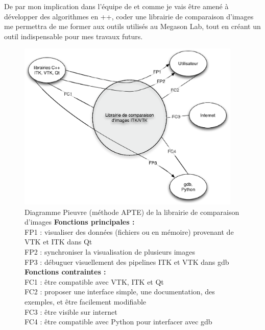 De par mon implication dans l'équipe de {\gofigure} et
comme je vais être amené à développer des algorithmes en {\C++},
coder une librairie de comparaison d'images me permettra de me former aux outils utilisés au Megason Lab,
tout en créant un outil indispensable pour mes travaux futurs.

\begin{figure}[h]
  \begin{center}
  \leavevmode
  \includegraphics[width=0.95\textwidth]{pictures/ComparePIEUVRE}
  \end{center}
  \caption[Diagramme Pieuvre (méthode {APTE\textregistered}) de
    la librairie de comparaison d'images]{Diagramme
    Pieuvre (méthode {APTE\textregistered})
    de la librairie de comparaison d'images
  \small
  \textbf{Fonctions principales :}\\
  FP1 : visualiser des données (fichiers ou en mémoire) provenant 
    de VTK et ITK dans Qt\\
  FP2 : synchroniser la visualisation de plusieurs images\\
  FP3 : débuguer visuellement des pipelines ITK et VTK dans gdb\\
    \textbf{Fonctions contraintes :} \\
  FC1 : être compatible avec VTK, ITK et Qt\\
  FC2 : proposer une interface simple, une documentation, des exemples, et être
    facilement modifiable\\
  FC3 : être visible sur internet\\
  FC4 : être compatible avec Python pour interfacer avec gdb}
  \label{fig:PIEUVRECompare}
\end{figure}


